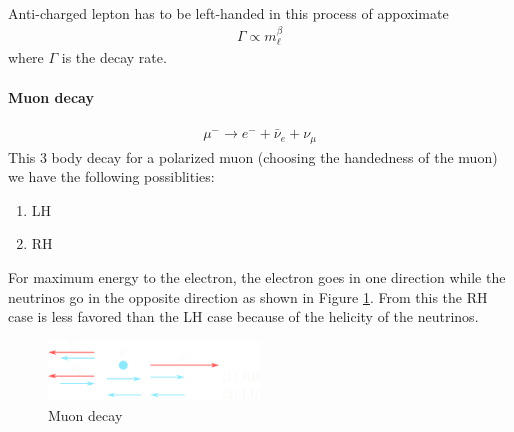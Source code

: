\documentclass[../main.tex]{subfiles}
\begin{document}
\paragraph*{} Anti-charged lepton has to be left-handed in this process of appoximate
\begin{align*}
    \Gamma \propto m_\ell^\beta
\end{align*}
where $\Gamma$ is the decay rate.

\paragraph*{Muon decay}
\begin{align*}
    \mu^- \to e^- + \bar \nu_e + \nu_\mu
\end{align*}
This 3 body decay for a polarized muon (choosing the handedness of the muon) we have the following
possiblities:
\begin{enumerate}
    \item LH
    \item RH
\end{enumerate}
For maximum energy to the electron, the electron goes in one direction while the neutrinos go in the
opposite direction as shown in Figure \ref{fig:muon_decay}. From this the RH case is less favored
than the LH case because of the helicity of the neutrinos.
\begin{figure}[ht]
    \centering
    \includegraphics[width=0.5\textwidth]{muon_decay.png}
    \caption{Muon decay}
    \label{fig:muon_decay}
\end{figure}
\end{document}
